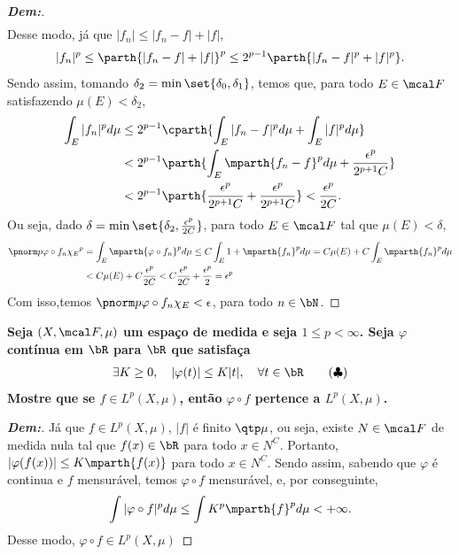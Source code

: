 \begin{proof}[\textbf{Dem:}]
\begin{align*}
  \end{align*}
  Desse modo, já que $|f_n| \le |f_n - f| + |f|$,
  \begin{align*}
    |f_n|^p \le \parth{|f_n - f| + |f|}^p \le 2^{p-1}\parth{|f_n - f|^p + |f|^p}.
  \end{align*}
  Sendo assim, tomando $\delta_2 = \min\set{\delta_0, \delta_1}$, 
  temos que, para todo $E \in \mcal F$ satisfazendo $\mu(E)<\delta_2$, 
  \begin{align*}
    \int_{E} |f_n|^p d\mu &\le 2^{p-1}\cparth{\int_{E} |f_n - f|^p d\mu 
    + \int_{E} |f|^p d\mu}\\
    &<2^{p-1}\parth{\int_{E} \mparth{f_n - f}^p d\mu + \frac{\epsilon^p}{2^{p+1}C}}\\
    &<2^{p-1}\parth{ \frac{\epsilon^p}{2^{p+1}C} 
    +  \frac{\epsilon^p}{2^{p+1}C}} < \frac{\epsilon^p}{2C}.
  \end{align*}
  Ou seja, dado $\delta = \min\set{\delta_2, \frac{\epsilon^p}{2C}}$, 
  para todo $E \in \mcal F$ tal que $\mu(E) < \delta$,
  \begin{align*}
    \pnorm p {\varphi \circ f_n \chi_E}^p &= \int_E \mparth{\varphi \circ f_n}^p d\mu
    \le C \int_E 1 + \mparth{f_n}^pd\mu = C \mu(E) + C\int_{E} \mparth{f_n}^p d\mu\\
    &< C \mu(E) + C\frac{\epsilon^p}{2C} < C\frac{\epsilon^p}{2C} + \frac{\epsilon^p}{2} 
    =\epsilon^p
  \end{align*}
  Com isso,temos $\pnorm p {\varphi \circ f_n \chi_E} < \epsilon$, para todo $n \in \bN$.
\end{proof}

\textbf{Seja $(X, \mcal F, \mu)$ um espaço de medida e seja $1 \le p < \infty$. 
Seja $\varphi$ contínua em $\bR$ para $\bR$ que satisfaça 
\begin{align*}
  \exists K \ge 0, \quad |\varphi(t)| \le K|t|, \quad \forall t \in \bR
   \tag{$\clubsuit$}
    \label{eq:5.15.0}
\end{align*}
Mostre que se $f \in L^p(X, \mu)$, então $\varphi \circ f$ pertence a 
$L^p(X, \mu)$.}
\begin{proof}[\textbf{Dem:}] Já que $f\in L^p(X, \mu)$, $|f|$ é finito $\qtp \mu$, ou seja, 
  existe $N \in \mcal F$ de medida nula tal que $f(x) \in\bR$ para todo $x \in N^C$. 
  Portanto, $|\varphi(f(x))| \le K \mparth{f(x)}$ para todo $x \in N^C$. Sendo assim,
  sabendo que $\varphi$ é continua e $f$ mensurável, temos $\varphi \circ f$ mensurável, 
  e, por conseguinte,
  \begin{align*}
    \int |\varphi \circ f|^p d\mu \le \int K^p \mparth{f}^p d\mu < +\infty.  
     \end{align*}
  Desse modo, $\varphi \circ f \in L^p(X, \mu)$
\end{proof}

